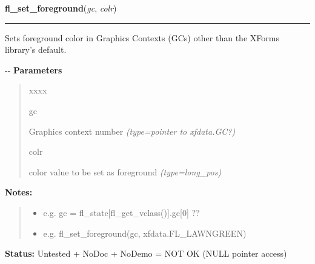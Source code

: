 \hspace{.8\funcindent}\begin{boxedminipage}{\funcwidth}

    \raggedright \textbf{fl\_set\_foreground}(\textit{gc}, \textit{colr})

    \vspace{-1.5ex}

    \rule{\textwidth}{0.5\fboxrule}
\setlength{\parskip}{2ex}

Sets foreground color in Graphics Contexts (GCs) other than the XForms
library's default.

-{}-
\setlength{\parskip}{1ex}
      \textbf{Parameters}
      \vspace{-1ex}

      \begin{quote}
        \begin{Ventry}{xxxx}

          \item[gc]


Graphics context number
            {\it (type=pointer to xfdata.GC?)}

          \item[colr]


color value to be set as foreground
            {\it (type=long\_pos)}

        \end{Ventry}

      \end{quote}

\textbf{Notes:}
\begin{quote}
  \begin{itemize}

  \item
    \setlength{\parskip}{0.6ex}

e.g. gc = fl\_state{[}fl\_get\_vclass(){]}.gc{[}0{]} ??


  \item 
e.g. fl\_set\_foreground(gc, xfdata.FL\_LAWNGREEN)


\end{itemize}

\end{quote}

\textbf{Status:} 
Untested + NoDoc + NoDemo = NOT OK (NULL pointer access)


    \end{boxedminipage}

    \label{xformslib:flxbasic:fl_set_background}

